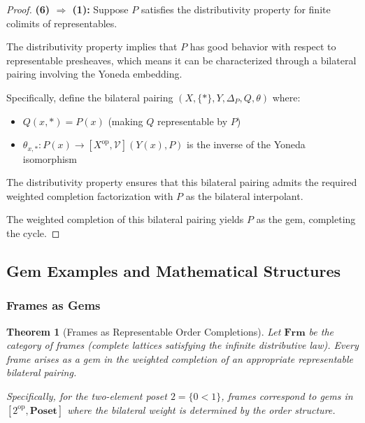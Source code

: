 \documentclass[11pt]{article}
\theoremstyle{plain}
\newtheorem{theorem}{Theorem}[section]
\theoremstyle{definition}
\theoremstyle{remark}
\newcommand{\V}{\mathcal{V}}
\newcommand{\op}{\mathrm{op}}
\begin{document}
\begin{proof}
\textbf{(6) $\Rightarrow$ (1):}
Suppose $P$ satisfies the distributivity property for finite colimits of representables.

The distributivity property implies that $P$ has good behavior with respect to representable presheaves, which means it can be characterized through a bilateral pairing involving the Yoneda embedding.

Specifically, define the bilateral pairing $(X, \{\ast\}, Y, \Delta_P, Q, \theta)$ where:
\begin{itemize}
\item $Q(x, \ast) = P(x)$ (making $Q$ representable by $P$)
\item $\theta_{x,\ast} : P(x) \to [X^{\op}, \V](Y(x), P)$ is the inverse of the Yoneda isomorphism
\end{itemize}

The distributivity property ensures that this bilateral pairing admits the required weighted completion factorization with $P$ as the bilateral interpolant.

The weighted completion of this bilateral pairing yields $P$ as the gem, completing the cycle.
\end{proof}

\subsection{Gem Examples and Mathematical Structures}

\subsubsection{Frames as Gems}

\begin{theorem}[Frames as Representable Order Completions]\label{thm:frames-as-gems}
Let $\mathbf{Frm}$ be the category of frames (complete lattices satisfying the infinite distributive law). Every frame arises as a gem in the weighted completion of an appropriate representable bilateral pairing.

Specifically, for the two-element poset $2 = \{0 < 1\}$, frames correspond to gems in $[2^{\op}, \mathbf{Poset}]$ where the bilateral weight is determined by the order structure.
\end{theorem}
\end{document}
